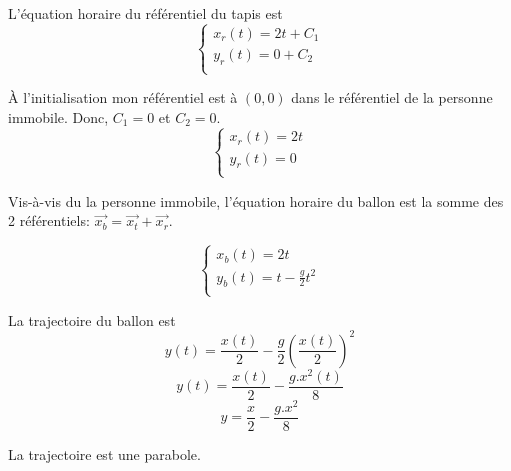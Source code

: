 \documentclass[]{book}
\theoremstyle{definition}
\begin{document}
L'\'equation horaire du r\'ef\'erentiel du tapis est
$$
\left\{
\begin{array}{l}
 x_r(t) =  2t + C_1 \\
 y_r(t) =  0 + C_2\\
\end{array}
\right. 
$$

\`A l'initialisation mon r\'ef\'erentiel est \`a $(0,0)$ dans le r\'ef\'erentiel de la personne immobile. Donc, $C_1 = 0$ et $C_2 = 0$.
$$
\left\{
\begin{array}{l}
 x_r(t) =  2t \\
 y_r(t) =  0 \\
\end{array}
\right. 
$$

Vis-\`a-vis du la personne immobile, l'\'equation horaire du ballon est la somme des 2 r\'ef\'erentiels: $\overrightarrow{x_b} = \overrightarrow{x_t} + \overrightarrow{x_r}$.

$$
\left\{
\begin{array}{l}
 x_b(t) =  2t \\
 y_b(t) =  t -\frac{g}{2}t^2 \\
\end{array}
\right. 
$$

La trajectoire du ballon est 
$$y(t) = \frac{x(t)}{2} - \frac{g}{2}(\frac{x(t)}{2})^2$$
$$y(t) = \frac{x(t)}{2} - \frac{g.x^2(t)}{8}$$
$$y = \frac{x}{2} - \frac{g.x^2}{8}$$

La trajectoire est une parabole.
\end{document}
